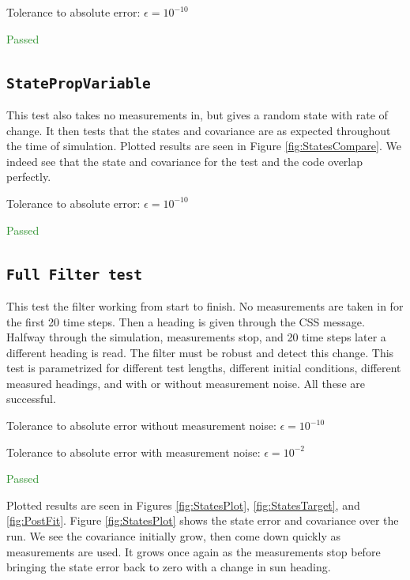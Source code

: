 \documentclass[]{BasiliskReportMemo}
\begin{document}
Tolerance to absolute error: $\epsilon = 10^{-10}$

\textcolor{ForestGreen}{Passed}



\subsection{\texttt{StatePropVariable}}

This test also takes no measurements in, but gives a random state with rate of change. It then tests that the states and covariance are as expected throughout the time of simulation. Plotted results are seen in Figure \ref{fig:StatesCompare}. We indeed see that the state and covariance for the test and the code overlap perfectly.

Tolerance to absolute error: $\epsilon = 10^{-10}$

\textcolor{ForestGreen}{Passed}


\subsection{\texttt{Full Filter test}}

This test the filter working from start to finish. No measurements are taken in for the first 20 time steps. Then a heading is given through the CSS message. Halfway through the simulation, measurements stop, and 20 time steps later a different heading is read. The filter must be robust and detect this change. This test is parametrized for different test lengths, different initial conditions, different measured headings, and with or without measurement noise. All these are successful.

\vspace{0.2cm}
Tolerance to absolute error without measurement noise: $\epsilon = 10^{-10}$

Tolerance to absolute error with measurement noise: $\epsilon = 10^{-2}$

\textcolor{ForestGreen}{Passed}

Plotted results are seen in Figures \ref{fig:StatesPlot}, \ref{fig:StatesTarget}, and \ref{fig:PostFit}. Figure \ref{fig:StatesPlot} shows the state error and covariance over the run. We see the covariance initially grow, then come down quickly as measurements are used. It grows once again as the measurements stop before bringing the state error back to zero with a change in sun heading. 
\end{document}
